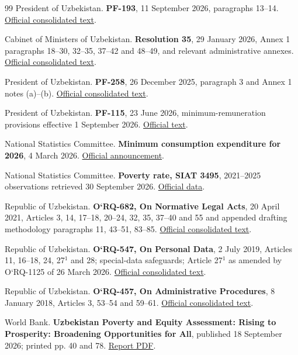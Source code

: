 \begin{thebibliography}{99}
 President of Uzbekistan. \textbf{PF-193}, 11 September 2026, paragraphs 13–14. \href{https://lex.uz/docs/-8472526}{Official consolidated text}.

 Cabinet of Ministers of Uzbekistan. \textbf{Resolution 35}, 29 January 2026, Annex 1 paragraphs 18–30, 32–35, 37–42 and 48–49, and relevant administrative annexes. \href{https://lex.uz/docs/-8027513}{Official consolidated text}.

 President of Uzbekistan. \textbf{PF-258}, 26 December 2025, paragraph 3 and Annex 1 notes (a)–(b). \href{https://lex.uz/docs/-7952180}{Official consolidated text}.

 President of Uzbekistan. \textbf{PF-115}, 23 June 2026, minimum-remuneration provisions effective 1 September 2026. \href{https://lex.uz/docs/-8283656}{Official text}.

 National Statistics Committee. \textbf{Minimum consumption expenditure for 2026}, 4 March 2026. \href{https://stat.uz/uz/matbuot-markazi/qo-mita-yangiliklar/67179-minimal-istemol-kharazhatlari-ijmati-t-risida-2}{Official announcement}.

 National Statistics Committee. \textbf{Poverty rate, SIAT 3495}, 2021–2025 observations retrieved 30 September 2026. \href{https://siat.stat.uz/data/3495/}{Official data}.

 Republic of Uzbekistan. \textbf{O‘RQ-682, On Normative Legal Acts}, 20 April 2021, Articles 3, 14, 17–18, 20–24, 32, 35, 37–40 and 55 and appended drafting methodology paragraphs 11, 43–51, 83–85. \href{https://lex.uz/docs/-5378966}{Official consolidated text}.

 Republic of Uzbekistan. \textbf{O‘RQ-547, On Personal Data}, 2 July 2019, Articles 11, 16–18, 24, 27$^{1}$ and 28; special-data safeguards; Article 27$^{1}$ as amended by O‘RQ-1125 of 26 March 2026. \href{https://lex.uz/docs/-4396419}{Official consolidated text}.

 Republic of Uzbekistan. \textbf{O‘RQ-457, On Administrative Procedures}, 8 January 2018, Articles 3, 53–54 and 59–61. \href{https://lex.uz/docs/-3492199}{Official consolidated text}.

 World Bank. \textbf{Uzbekistan Poverty and Equity Assessment: Rising to Prosperity: Broadening Opportunities for All}, published 18 September 2026; printed pp. 40 and 78. \href{https://documents1.worldbank.org/curated/en/099091826081016988/pdf/P507037-a67dabb6-2302-46a0-be08-a951d35f90c3.pdf}{Report PDF}.


\end{thebibliography}
